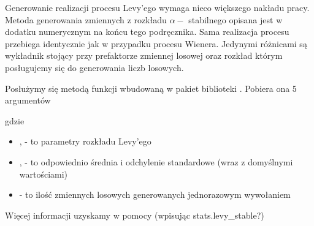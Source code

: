 \documentclass[a4paper,12pt,polish]{sphinxmanual}
\begin{document}
Generowanie realizacji procesu Levy'ego wymaga nieco większego nakładu pracy.
Metoda generowania zmiennych z rozkładu $\alpha-$ stabilnego opisana jest w
dodatku numerycznym na końcu tego podręcznika. Sama realizacja procesu przebiega
identycznie jak w przypadku procesu Wienera. Jedynymi różnicami są wykładnik
stojący przy prefaktorze zmiennej losowej oraz rozkład którym posługujemy się
do generowania liczb losowych.

Posłużymy się metodą  funkcji  wbudowaną w pakiet  biblioteki
. Pobiera ona 5 argumentów
\begin{quote}

\end{quote}

gdzie
\begin{itemize}
\item {} 
,  - to parametry rozkładu Levy'ego

\item {} 
,  - to odpowiednio średnia i odchylenie standardowe (wraz z domyślnymi wartościami)

\item {} 
 - to ilość zmiennych losowych generowanych jednorazowym wywołaniem

\end{itemize}

Więcej informacji uzyskamy w pomocy (wpisując stats.levy\_stable?)
\end{document}
